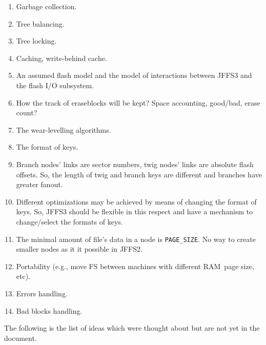 \documentclass[12pt,a4paper,oneside,titlepage]{article}
\begin{document}
\begin{enumerate}

\item Garbage collection.

\item Tree balancing.

\item Tree locking.

\item Caching, write-behind cache.

\item An assumed flash model and the model of interactions between JFFS3 and
the flash I/O subsystem.

\item How the track of eraseblocks will be kept? Space accounting, good/bad,
erase count?

\item The wear-levelling algorithms.

\item The format of keys.

\item Branch nodes' links are sector numbers, twig nodes' links are absolute
flash offsets. So, the length of twig and branch keys are different and
branches have greater fanout.

\item Different optimizations may be achieved by means of changing the format
of keys. So, JFFS3 should be flexible in this respect and have a mechanism to
change/select the formats of keys.

\item The minimal amount of file's data in a node is \texttt{PAGE\_SIZE}. No
way to create smaller nodes as it it possible in JFFS2.

\item Portability (e.g., move FS between machines with different RAM~page size,
etc).

\item Errors handling.

\item Bad blocks handling.

\end{enumerate}

The following is the list of ideas which were thought about but are not yet in
the document.
\end{document}
